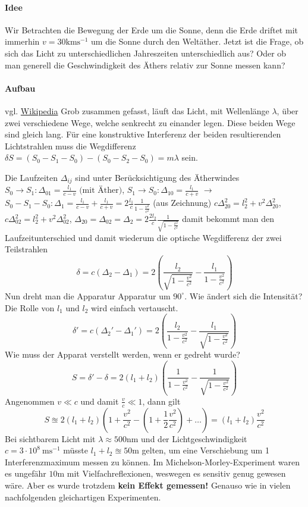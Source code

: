 \documentclass[oneside]{book}
\theoremstyle{definition}
\newcommand{\conseq}{$\rightarrow$~}
\begin{document}
{\paragraph{Idee} Wir Betrachten die Bewegung der Erde um die Sonne, denn die Erde driftet mit immerhin $v = 30 \mathrm{km}\mathrm{s}^{-1}$ um die Sonne durch den Weltäther. Jetzt ist die Frage, ob sich das Licht zu unterschiedlichen Jahreszeiten unterschiedlich aus? Oder ob man generell die Geschwindigkeit des Äthers relativ zur Sonne messen kann?

\paragraph{Aufbau} vgl. \href{https://de.wikipedia.org/wiki/Michelson-Morley-Experiment}{Wikipedia}
Grob zusammen gefasst, läuft das Licht, mit Wellenlänge $\lambda$, über zwei verschiedene Wege, welche senkrecht zu einander legen. Diese beiden Wege sind gleich lang. Für eine konstruktive Interferenz der beiden resultierenden Lichtstrahlen muss die Wegdifferenz $\delta S = (S_0 - S_1 - S_0) - (S_0 - S_2 - S_0) = m \lambda$ sein.

Die Laufzeiten $\Delta_{ij}$ sind unter Berücksichtigung des Ätherwindes $S_0 \to S_1: \Delta_{01} = \frac{l_1}{c - v} \text{~(mit Äther)}$, $S_1 \to S_0: \Delta_{10} = \frac{l_1}{c + v}$ \conseq $S_0 - S_1 - S_0: \Delta_1 = \frac{l_1}{c-v} + \frac{l_1}{c+v} = 2 \frac{l_1}{c} \frac{1}{1 - \frac{v^2}{c^2}}$ (aus Zeichnung) $c\Delta_{20}^2 = l_2^2 + v^2 \Delta_{20}^2$, $c\Delta_{02}^2 = l_2^2 + v^2 \Delta_{02}^2$, $\Delta_{20} = \Delta_{02} = \Delta_{2} = 2 \frac{2l_2}{c} \frac{1}{\sqrt{1 - \frac{v^2}{c^2}}}$ damit bekommt man den Laufzeitunterschied und damit wiederum die optische Wegdifferenz der zwei Teilstrahlen
$$\delta = c (\Delta_2 - \Delta_1) = 2 \left(\frac{l_2}{\sqrt{1 - \frac{v^2}{c^2}}} - \frac{l_1}{1 - \frac{v^2}{c^2}}\right)$$ 
Nun dreht man die Apparatur Apparatur um $90^\circ$. Wie ändert sich die Intensität? Die Rolle von $l_1$ und $l_2$ wird einfach vertauscht.
$$\delta' = c (\Delta_2' - \Delta_1') = 2 \left(\frac{l_2}{1 - \frac{v^2}{c^2}} - \frac{l_1}{\sqrt{1 - \frac{v^2}{c^2}}}\right)$$
Wie muss der Apparat verstellt werden, wenn er gedreht wurde?
$$S = \delta' - \delta = 2(l_1 + l_2) \left(\frac{1}{1-\frac{v^2}{c^2}} - \frac{1}{\sqrt{1 - \frac{v^2}{c^2}}}\right)$$
Angenommen  $v \ll c$ und damit $\frac{v}{c} \ll 1$, dann gilt
$$S \approxeq 2 (l_1 + l_2) \left(1 + \frac{v^2}{c^2} - (1 + \frac{1}{2} \frac{v^2}{c^2}) + \dots\right) = (l_1 + l_2) \frac{v^2}{c^2}$$
Bei sichtbarem Licht mit $\lambda \approx 500 \mathrm{nm}$ und der Lichtgeschwindigkeit $c = 3 \cdot 10^8 ~\mathrm{m} \mathrm{s}^{-1}$ müsste $l_1 + l_2 \approxeq 50 \mathrm{m}$ gelten, um eine Verschiebung um 1 Interferenzmaximum messen zu können.
Im Michelson-Morley-Experiment waren es ungefähr $10 \mathrm{m}$ mit Vielfachreflexionen, weswegen es sensitiv genug gewesen wäre. Aber es wurde trotzdem \textbf{kein Effekt gemessen!} Genauso wie in vielen nachfolgenden gleichartigen Experimenten.}
\end{document}
